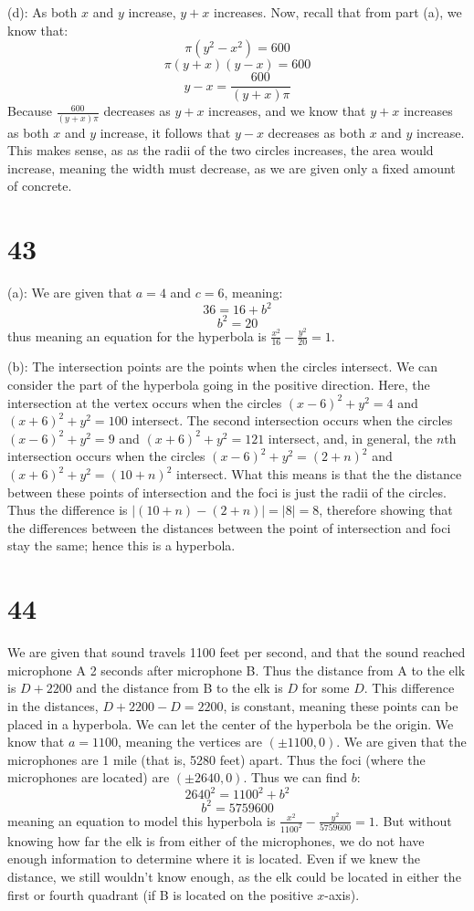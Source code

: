 \documentclass{article}
\theoremstyle{definition}
\newcommand{\?}{\stackrel{?}{=}}
\begin{document}
(d): As both $x$ and $y$ increase, $y+x$ increases. Now, recall that from part (a), we know that:
\[ \pi(y^2-x^2)=600 \]
\[ \pi(y+x)(y-x)=600 \]
\[ y-x=\frac{600}{(y+x)\pi} \]
Because $\frac{600}{(y+x)\pi}$ decreases as $y+x$ increases, and we know that $y+x$ increases as both $x$ and $y$ increase, it follows that 
$y-x$ decreases as both $x$ and $y$ increase. This makes sense, as as the radii of the two circles increases, the area would increase, meaning the width must decrease, as we are given only a 
fixed amount of concrete. 


\section*{43}
(a): We are given that $a=4$ and $c=6$, meaning:
\[ 36=16+b^2 \] \[ b^2=20 \] thus meaning an equation for the hyperbola is $\frac{x^2}{16}-\frac{y^2}{20}=1$. 


(b):
The intersection points are the points when the circles intersect. We can consider the part of the hyperbola going in the positive direction. Here, the intersection at the vertex occurs 
when the circles $(x-6)^2+y^2=4$ and $(x+6)^2+y^2=100$ intersect. The second intersection occurs when the circles $(x-6)^2+y^2=9$ and $(x+6)^2+y^2=121$ intersect, and, in general, the 
$n$th intersection occurs when the circles $(x-6)^2+y^2=(2+n)^2$ and $(x+6)^2+y^2=(10+n)^2$ intersect. What this means is that the the distance between these points of intersection and the 
foci is just the radii of the circles. Thus the difference is $|(10+n)-(2+n)|=|8|=8$, therefore showing that the differences between the distances between the point of intersection and foci stay 
the same; hence this is a hyperbola.

\section*{44}
We are given that sound travels 1100 feet per second, and that the sound reached microphone A 2 seconds after microphone B. Thus the distance from A to the elk is 
$D+2200$ and the distance from B to the elk is $D$ for some $D$. This difference in the distances, $D+2200-D=2200$, is constant, meaning these points can be placed in a hyperbola. We can let the 
center of the hyperbola be the origin. We know that $a=1100$, meaning the vertices are $(\pm 1100, 0)$. We are given that the microphones are 1 mile (that is, 5280 feet) apart. 
Thus the foci (where the microphones are located) are $(\pm 2640,0)$. Thus we can find $b$:
\[ 2640^2=1100^2+b^2 \] \[ b^2=5759600 \] meaning an equation to model this hyperbola is $\frac{x^2}{1100^2}-\frac{y^2}{5759600}=1$. But without knowing how far the elk is from 
either of the microphones, we do not have enough information to determine where it is located. Even if we knew the distance, we still wouldn't know enough, as the elk could be located 
in either the first or fourth quadrant (if B is located on the positive $x$-axis). 
\end{document}

